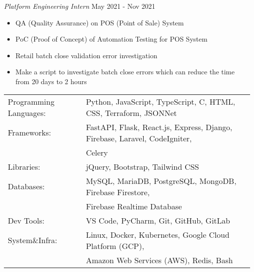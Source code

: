 \textit{Platform Engineering Intern} \hfill May 2021 - Nov 2021\\
\vspace{-1mm}
\begin{itemize}
	\item QA (Quality Assurance) on POS (Point of Sale) System
	\item PoC (Proof of Concept) of Automation Testing for POS System
	\item Retail batch close validation error investigation
	\item Make a script to investigate batch close errors which can reduce the time from 20 days to 2 hours
\end{itemize}

\begin{tabular}{ l l }
	Programming Languages: & Python, JavaScript, TypeScript, C, HTML, CSS, Terraform, JSONNet                         \\
	Frameworks:            & FastAPI, Flask, React.js, Express, Django, Firebase, Laravel, CodeIgniter,  \\ & Celery        \\
	Libraries:             & jQuery, Bootstrap, Tailwind CSS                                                          \\
	Databases:             & MySQL, MariaDB, PostgreSQL, MongoDB, Firebase Firestore, \\ & Firebase Realtime Database      \\
	Dev Tools:             & VS Code, PyCharm, Git, GitHub, GitLab                                                    \\
	System\&Infra:         & Linux, Docker, Kubernetes, Google Cloud Platform (GCP), \\ & Amazon Web Services (AWS), Redis, Bash \\
\end{tabular}
\vspace{2mm}

